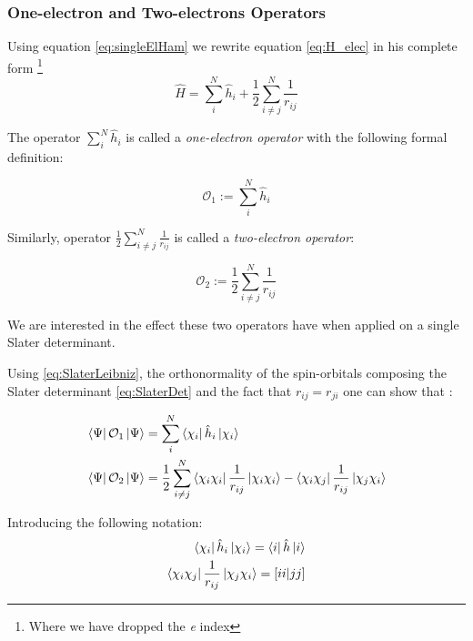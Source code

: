 \documentclass[a4paper,12pt]{article}
\newcommand{\jsqrt}[2]{\bqty{ #1 #1 | #2 #2 }}
\begin{document}
\subsubsection{One-electron and Two-electrons Operators}

Using  equation \eqref{eq:singleElHam} we rewrite equation \eqref{eq:H_elec} in his complete form \footnote{Where we have dropped the \textit{e} index}
\begin{equation}
	\hat{H} = \sum_{i}^{N} \hat{h}_{i} + \frac{1}{2} \sum_{i \neq j}^{N} \frac{1}{r_{ij}}
\end{equation}

The operator $\sum_{i}^{N} \hat{h}_{i}$ is called a \textit{one-electron operator} with the following formal definition:

\begin{equation}\label{eq:singleEl}
	\mathcal{O}_{1} := \sum_{i}^{N} \hat{h}_{i}
\end{equation}

Similarly, operator $\frac{1}{2} \sum_{i \neq j}^{N} \frac{1}{r_{ij}}$ is called a \textit{two-electron operator}:

\begin{equation}
	\mathcal{O}_{2} := \frac{1}{2} \sum_{i \neq j}^{N} \frac{1}{r_{ij}}
\end{equation}

We are interested in the effect these two operators have when applied on a single Slater determinant.

Using \eqref{eq:SlaterLeibniz}, the orthonormality of the spin-orbitals composing the Slater determinant \eqref{eq:SlaterDet} and the fact that $r_{ij} = r_{ji}$ one can show that \cite[p.74-81]{Attila}:

\begin{align}
	& \bra{\Psi} \mathcal{O}_{1} \ket{\Psi} = \sum_{i}^{N} \bra{\chi_{i}} \hat{h}_i \ket{\chi_{i}} \\
	& \bra{\Psi} \mathcal{O}_{2} \ket{\Psi} = \frac{1}{2} \sum_{i \neq j}^{N} \bra{\chi_i \chi_i} \frac{1}{r_{ij}} \ket{ \chi_{i} \chi_{i}} - \bra{\chi_i \chi_j} \frac{1}{r_{ij}} \ket{ \chi_{j} \chi_{i}}
\end{align}

Introducing the following notation:
\begin{align}
	\bra{\chi_{i}} \hat{h}_i \ket{\chi_{i}} = \bra{i} \hat{h} \ket{i}
	\\
	\bra{\chi_{i} \chi_{j}} \frac{1}{r_{ij}} \ket{ \chi_{j} \chi_{i}} = \jsqrt{i}{j} \label{eq:squareNotation}
\end{align}
\end{document}
